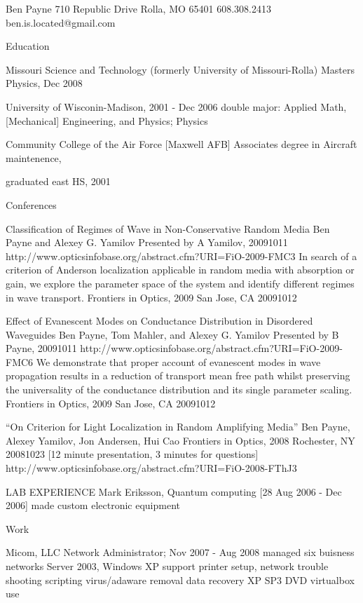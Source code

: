 

Ben Payne
710 Republic Drive
Rolla, MO 65401
608.308.2413
ben.is.located@gmail.com

Education

Missouri Science and Technology (formerly University of Missouri-Rolla)
        Masters Physics, Dec 2008

University of Wisconin-Madison, 2001 - Dec 2006
       double major: Applied Math, [Mechanical] Engineering, and Physics; Physics

Community College of the Air Force [Maxwell AFB]
Associates degree in Aircraft maintenence,

graduated east HS, 2001



Conferences

Classification of Regimes of Wave in Non-Conservative Random Media
Ben Payne and Alexey G. Yamilov 
Presented by A Yamilov, 20091011
http://www.opticsinfobase.org/abstract.cfm?URI=FiO-2009-FMC3
In search of a criterion of Anderson localization applicable in random media with absorption or gain, we explore the parameter space of the system and identify different regimes in wave transport.
Frontiers in Optics, 2009
San Jose, CA 20091012


Effect of Evanescent Modes on Conductance Distribution in Disordered Waveguides
Ben Payne, Tom Mahler, and Alexey G. Yamilov 
Presented by B Payne, 20091011
http://www.opticsinfobase.org/abstract.cfm?URI=FiO-2009-FMC6
We demonstrate that proper account of evanescent modes in wave propagation results in a reduction of transport mean free path whilst preserving the universality of the conductance distribution and its single parameter scaling.
Frontiers in Optics, 2009
San Jose, CA 20091012

``On Criterion for Light Localization in Random Amplifying Media''
Ben Payne, Alexey Yamilov, Jon Andersen, Hui Cao
Frontiers in Optics, 2008
Rochester, NY 20081023
[12 minute presentation, 3 minutes for questions]
http://www.opticsinfobase.org/abstract.cfm?URI=FiO-2008-FThJ3

LAB EXPERIENCE
       Mark Eriksson, Quantum computing [28 Aug 2006 - Dec 2006]
           made custom electronic equipment


Work

Micom, LLC
Network Administrator; Nov 2007 - Aug 2008
        managed six buisness networks
        Server 2003, Windows XP support
        printer setup, network trouble shooting
        scripting
        virus/adaware removal
        data recovery
        XP SP3 DVD
        virtualbox use

